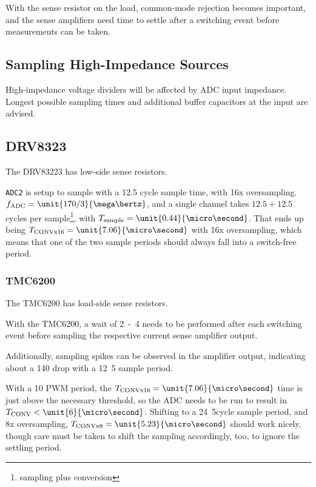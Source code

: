 \documentclass[12pt,a4paper,oneside,openany]{article}
\begin{document}
With the sense resistor on the load, common-mode rejection becomes important, and the sense amplifiers need time to settle after a switching event before measurements can be taken.

\subsection{Sampling High-Impedance Sources}

High-impedance voltage dividers will be affected by ADC input impedance. Longest possible sampling times and additional buffer capacitors at the input are advised.

\subsection{DRV8323}

The DRV83223 has low-side sense resistors.

\texttt{ADC2} is setup to sample with a 12.5 cycle sample time, with 16x oversampling. $f_{\textrm{ADC}} = \unit{170/3}{\mega\hertz}$, and a single channel takes $12.5+12.5$ cycles per sample\footnote{sampling plus conversion}, with $T_{\textrm{sample}} = \unit{0.44}{\micro\second}$. That ends up being $T_{\textrm{CONVx16}} = \unit{7.06}{\micro\second}$ with 16x oversampling, which means that one of the two sample periods should always fall into a switch-free period.

\subsubsection{TMC6200}

The TMC6200 has load-side sense resistors.

With the TMC6200, a wait of \unit{2-4}{\micro\second} needs to be performed after each switching event before sampling the respective current sense amplifier output.

Additionally, sampling spikes can be observed in the amplifier output, indicating about a \unit{140}{\milli\volt} drop with a \unit{12.5}{\nano\second} sample period.

With a \unit{10}{\micro\second} PWM period, the $T_{\textrm{CONVx16}} = \unit{7.06}{\micro\second}$ time is just above the necessary threshold, so the ADC needs to be run to result in $T_{\textrm{CONV}} < \unit{6}{\micro\second}$. Shifting to a \unit{24.5}{cycle} sample period, and 8x oversampling, $T_{\textrm{CONVx8}} = \unit{5.23}{\micro\second}$ should work nicely, though care must be taken to shift the sampling accordingly, too, to ignore the settling period.
\end{document}
